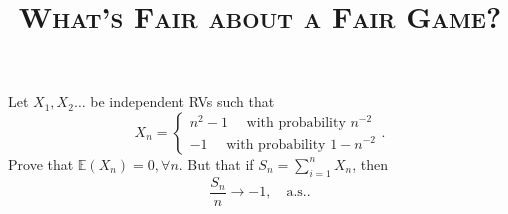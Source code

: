 
\title{\textsc{What's Fair about a Fair Game?}}

\maketitle
        
\begin{pro}[E4.7]
Let $X_1,X_2\ldots$ be independent RVs such that 
\[
X_{n} = \begin{cases}
		 n^2-1 \quad \text{ with probability } n^{-2} \\
		 -1 \quad \text{ with probability } 1- n^{-2}  
\end{cases}
.\]  
Prove that $\mathbb{E} \left( X_{n} \right) = 0, \forall n$. But that if $S_{n} = \sum_{i=1}^{n} X_{n}$, then 
\[
\frac{S_n}{n} \to  -1 , \quad \text{a.s.}
.\] 
\end{pro}
